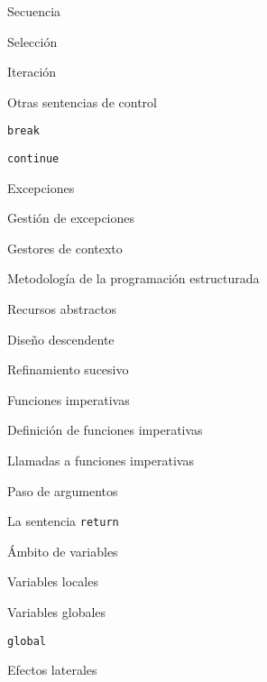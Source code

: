 \begin{longenum}
\begin{longenum}
        \begin{longenum}
            \item Secuencia
            \item Selección
            \item Iteración
            \item Otras sentencias de control
            \begin{longenum}
                \item \texttt{break}
                \item \texttt{continue}
                \item Excepciones
                \begin{longenum}
                    \item Gestión de excepciones
                \end{longenum}
                \item Gestores de contexto 
            \end{longenum}
        \end{longenum}
        \item Metodología de la programación estructurada
        \begin{longenum}
            \item Recursos abstractos
            \item Diseño descendente
            \item Refinamiento sucesivo
        \end{longenum}
        \item Funciones imperativas
        \begin{longenum}
            \item Definición de funciones imperativas
            \item Llamadas a funciones imperativas
            \item Paso de argumentos
            \item La sentencia \texttt{return}
            \item Ámbito de variables
            \begin{longenum}
                \item Variables locales
                \item Variables globales
                \begin{longenum}
                    \item \texttt{global}
                    \item Efectos laterales

\end{longenum}
\end{longenum}
\end{longenum}
\end{longenum}
\end{longenum}
